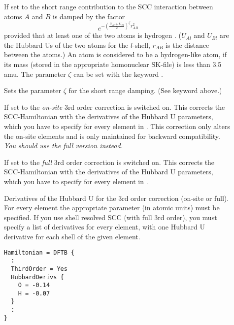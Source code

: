 \begin{description}

\item[] If set to  the short range contribution to the SCC
  interaction between atoms $A$ and $B$ is damped by the factor
  \begin{equation*}
    e^{-\left(\frac{U_{Al} + U_{Bl}}{2}\right)^\zeta r_{AB}^2}
  \end{equation*}
  provided that at least one of the two atoms is hydrogen
  \cite{gauss-jctc-7-931,yang-JPCA-111-10861}. ($U_{Al}$ and $U_{Bl}$ are the
  Hubbard Us of the two atoms for the $l$-shell, $r_{AB}$ is the distance
  between the atoms.) An atom is considered to be a hydrogen-like atom, if its
  mass (stored in the appropriate homonuclear SK-file) is less than 3.5 amu. The
  parameter $\zeta$ can be set with the keyword .

\item[] Sets the parameter $\zeta$ for the short range
  damping. (See keyword  above.)

\item[] If set to  the \textit{on-site} 3rd order
  correction \cite{yang-JPCA-111-10861} is switched on. This corrects the
  SCC-Hamiltonian with the derivatives of the Hubbard U parameters, which you
  have to specify for every element in . This correction only
  alters the on-site elements and is only maintained for backward
  compatibility. \emph{You should use the full version 
    instead.}

\item[] If set to  the \textit{full} 3rd order
  correction \cite{gauss-jctc-7-931} is switched on. This corrects the
  SCC-Hamiltonian with the derivatives of the Hubbard U parameters, which you
  have to specify for every element in .

\item[] Derivatives of the Hubbard U for the 3rd order
  correction (on-site or full). For every element the appropriate parameter (in
  atomic units) must be specified. If you use shell resolved SCC (with full
  3rd order), you must specify a list of derivatives for every element, with one
  Hubbard U derivative for each shell of the given element.
\begin{verbatim}
Hamiltonian = DFTB {
  :
  ThirdOrder = Yes
  HubbardDerivs {
    O = -0.14
    H = -0.07
  }
  :
}


\end{verbatim}
\end{description}
